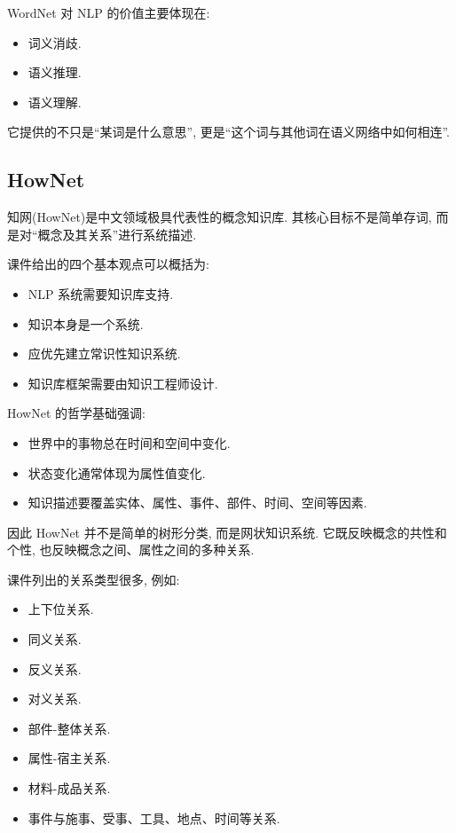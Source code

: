 WordNet 对 NLP 的价值主要体现在:

\begin{itemize}
\item 词义消歧.
\item 语义推理.
\item 语义理解.
\end{itemize}

它提供的不只是“某词是什么意思”, 更是“这个词与其他词在语义网络中如何相连”.

\subsection{HowNet}


知网(HowNet)是中文领域极具代表性的概念知识库.
其核心目标不是简单存词, 而是对“概念及其关系”进行系统描述.

课件给出的四个基本观点可以概括为:

\begin{itemize}
\item NLP 系统需要知识库支持.
\item 知识本身是一个系统.
\item 应优先建立常识性知识系统.
\item 知识库框架需要由知识工程师设计.
\end{itemize}

HowNet 的哲学基础强调:

\begin{itemize}
\item 世界中的事物总在时间和空间中变化.
\item 状态变化通常体现为属性值变化.
\item 知识描述要覆盖实体、属性、事件、部件、时间、空间等因素.
\end{itemize}

因此 HowNet 并不是简单的树形分类, 而是网状知识系统.
它既反映概念的共性和个性, 也反映概念之间、属性之间的多种关系.

课件列出的关系类型很多, 例如:

\begin{itemize}
\item 上下位关系.
\item 同义关系.
\item 反义关系.
\item 对义关系.
\item 部件-整体关系.
\item 属性-宿主关系.
\item 材料-成品关系.
\item 事件与施事、受事、工具、地点、时间等关系.
\end{itemize}

